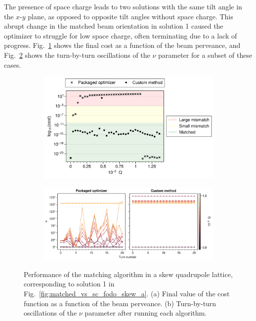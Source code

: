 The presence of space charge leads to two solutions with the same tilt angle in the $x$-$y$ plane, as opposed to opposite tilt angles without space charge. This abrupt change in the matched beam orientation in solution 1 caused the optimizer to struggle for low space charge, often terminating due to a lack of progress. Fig.~\ref{fig:optimizer_comparison_a} shows the final cost as a function of the beam perveance, and Fig.~\ref{fig:optimizer_comparison_b} shows the turn-by-turn oscillations of the $\nu$ parameter for a subset of these cases. 
%
\begin{figure}[!p]
    \centering
    \begin{subfigure}{0.8\textwidth}
        \includegraphics[width=\textwidth]{Images/chapter2/optimizer_comparison_costfunc.png}
        \caption{}
        \label{fig:optimizer_comparison_a}
    \end{subfigure}
    \vfill
    \vspace*{1cm}
    \vfill
    \begin{subfigure}{1.0\textwidth}
        \includegraphics[width=\textwidth]{Images/chapter2/optimizer_comparison_tbt.png}
        \caption{}
        \label{fig:optimizer_comparison_b}
    \end{subfigure}
    \caption{Performance of the matching algorithm in a skew quadrupole lattice, corresponding to solution 1 in Fig.~\ref{fig:matched_vs_sc_fodo_skew_a}. (a) Final value of the cost function as a function of the beam perveance. (b) Turn-by-turn oscillations of the $\nu$ parameter after running each algorithm.}
    \label{fig:optimizer_comparison}
\end{figure}

